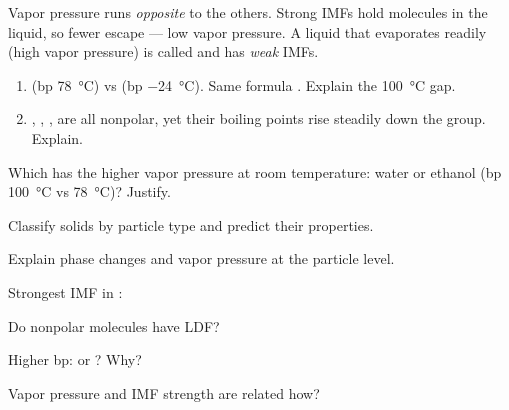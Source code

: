 \documentclass{apchem-notes}
\begin{document}
\begin{apctrap}
Vapor pressure runs \emph{opposite} to the others. Strong IMFs hold
molecules in the liquid, so fewer escape --- low vapor pressure. A liquid
that evaporates readily (high vapor pressure) is called
 and has \emph{weak} IMFs.
\end{apctrap}


\begin{enumerate}[leftmargin=*,itemsep=0.4em]
  \item {} (bp \SI{78}{\celsius}) vs 
        (bp \SI{-24}{\celsius}). Same formula . Explain the
        \SI{100}{\celsius} gap. 
  \item {}, , ,  are all nonpolar, yet their
        boiling points rise steadily down the group. Explain.
\end{enumerate}

\begin{exitticket}
Which has the higher vapor pressure at room temperature: water or ethanol
(bp \SI{100}{\celsius} vs \SI{78}{\celsius})? Justify.
\end{exitticket}


\begin{objectives}
  \item Classify solids by particle type and predict their properties.
  \item Explain phase changes and vapor pressure at the particle level.
\end{objectives}


\begin{warmup}[4]
  \item Strongest IMF in : 
  \item Do nonpolar molecules have LDF? 
  \item Higher bp:  or ? Why?
  \item Vapor pressure and IMF strength are related how?
\end{warmup}
\end{document}
